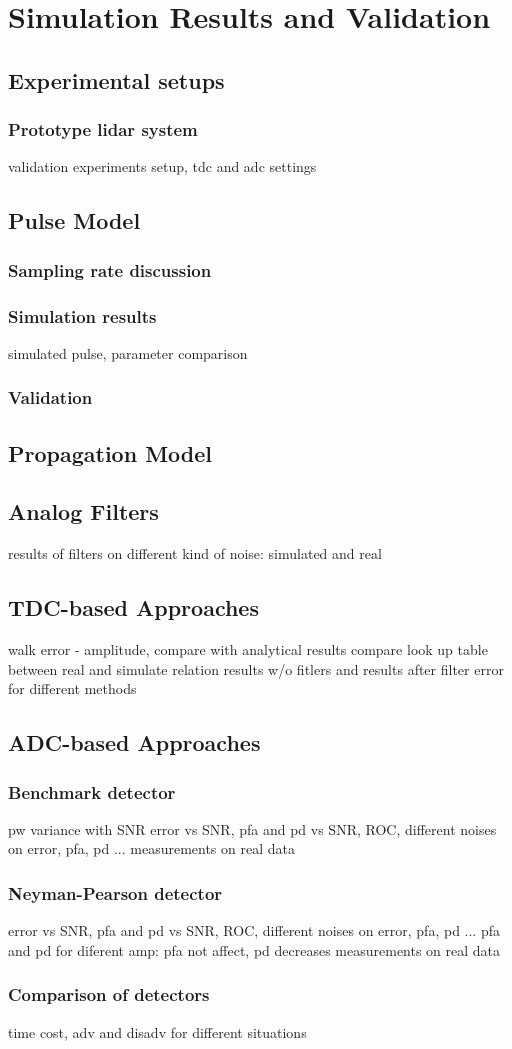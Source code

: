 \chapter{Simulation Results and Validation}
\section{Experimental setups}
\subsection{Prototype lidar system}
validation experiments setup, tdc and adc settings

\section{Pulse Model}
\subsection{Sampling rate discussion}
\subsection{Simulation results}
simulated pulse, parameter comparison
\subsection{Validation}

\section{Propagation Model}
\section{Analog Filters}
results of filters on different kind of noise: simulated and real
\section{TDC-based Approaches}
walk error - amplitude, compare with analytical results
compare look up table between real and simulate relation
results w/o fitlers and results after filter
error for different methods
\section{ADC-based Approaches}
\subsection{Benchmark detector}
pw variance with SNR
error vs SNR, pfa and pd vs SNR, ROC, 
different noises on error, pfa, pd ...
measurements on real data
\subsection{Neyman-Pearson detector}

error vs SNR, pfa and pd vs SNR, ROC, 
different noises on error, pfa, pd ...
pfa and pd for diferent amp: pfa not affect, pd decreases
measurements on real data
\subsection{Comparison of detectors}
time cost, adv and disadv for different situations


